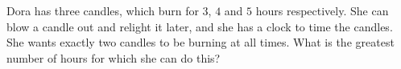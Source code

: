 Dora has three candles, which burn for $3$, $4$ and $5$ hours respectively. She can blow a candle out and relight it later, and she has a clock to time the candles. She wants exactly two candles to be burning at all times. What is the greatest number of hours for which she can do this?
